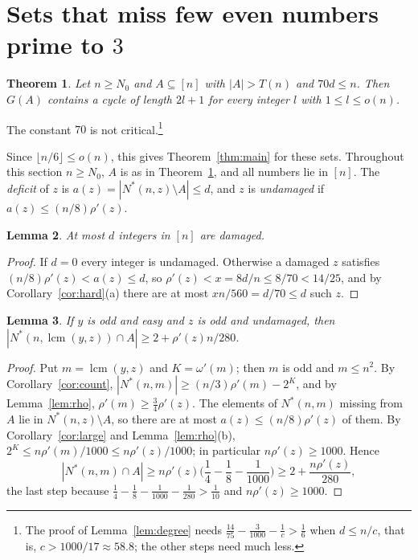 \documentclass[11pt,a4paper]{article}
\newtheorem{theorem}{Theorem}[section]
\newtheorem{lemma}[theorem]{Lemma}
\theoremstyle{definition}
\theoremstyle{remark}
\DeclareMathOperator{\lcm}{lcm}
\begin{document}
\section{\texorpdfstring{Sets that miss few even numbers prime to $3$}{Sets that miss few even numbers prime to 3}}\label{sec:few}

\begin{theorem}\label{thm:few}
Let $n\ge N_0$ and $A\subseteq[n]$ with $|A|>T(n)$ and $70d\le n$. Then $G(A)$ contains a cycle of
length $2l+1$ for every integer $l$ with $1\le l\le o(n)$.
\end{theorem}

The constant $70$ is not critical.\footnote{The proof of Lemma~\ref{lem:degree} needs
$\frac{14}{75}-\frac{3}{1000}-\frac1c>\frac16$ when $d\le n/c$, that is, $c>1000/17\approx58.8$; the
other steps need much less.}

Since $\lfloor n/6\rfloor\le o(n)$, this gives Theorem~\ref{thm:main} for these sets. Throughout
this section $n\ge N_0$, $A$ is as in Theorem~\ref{thm:few}, and all numbers lie in $[n]$. The
\emph{deficit} of $z$ is $a(z)=|N^*(n,z)\setminus A|\le d$, and $z$ is \emph{undamaged} if
$a(z)\le(n/8)\rho'(z)$.

\begin{lemma}\label{lem:damaged}
At most $d$ integers in $[n]$ are damaged.
\end{lemma}

\begin{proof}
If $d=0$ every integer is undamaged. Otherwise a damaged $z$ satisfies $(n/8)\rho'(z)<a(z)\le d$, so
$\rho'(z)<x=8d/n\le8/70<14/25$, and by Corollary~\ref{cor:hard}(a) there are at most
$xn/560=d/70\le d$ such $z$.
\end{proof}

\begin{lemma}\label{lem:connector}
If $y$ is odd and easy and $z$ is odd and undamaged, then $|N^*(n,\lcm(y,z))\cap A|\ge2+\rho'(z)n/280$.
\end{lemma}

\begin{proof}
Put $m=\lcm(y,z)$ and $K=\omega'(m)$; then $m$ is odd and $m\le n^2$. By Corollary~\ref{cor:count},
$|N^*(n,m)|\ge(n/3)\rho'(m)-2^K$, and by Lemma~\ref{lem:rho}, $\rho'(m)\ge\frac34\rho'(z)$. The
elements of $N^*(n,m)$ missing from $A$ lie in $N^*(n,z)\setminus A$, so there are at most
$a(z)\le(n/8)\rho'(z)$ of them. By Corollary~\ref{cor:large} and Lemma~\ref{lem:rho}(b),
$2^K\le n\rho'(m)/1000\le n\rho'(z)/1000$; in particular $n\rho'(z)\ge1000$. Hence
\[
  |N^*(n,m)\cap A|\ge n\rho'(z)\Big(\frac14-\frac18-\frac1{1000}\Big)\ge2+\frac{n\rho'(z)}{280},
\]
the last step because $\frac14-\frac18-\frac1{1000}-\frac1{280}>\frac1{10}$ and $n\rho'(z)\ge1000$.
\end{proof}
\end{document}
